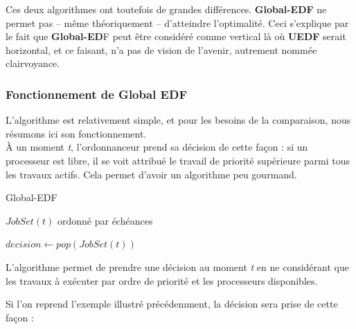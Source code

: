 	Ces deux algorithmes ont toutefois de grandes différences. \textbf{Global-EDF}
	ne permet pas -- même théoriquement -- d'atteindre l'optimalité. Ceci s'explique par le fait que 
	\textbf{Global-ED}F peut être considéré comme \og{}vertical\fg{} là où \textbf{UEDF} serait \og{}horizontal\fg{}, et ce faisant, 
	n'a pas de \og{}vision de l'avenir\fg{}, autrement nommée \og{}clairvoyance\fg{}.
	
	\subsubsection{Fonctionnement de Global EDF}
	
	L'algorithme est relativement simple, et pour les besoins de la comparaison, nous résumons 
	ici son fonctionnement.\\
	À un moment \textit{t}, l'ordonnanceur prend sa décision de cette façon :
	si un processeur est libre, il se voit attribué le travail de priorité supérieure parmi 
	tous les travaux actifs. Cela permet d'avoir un algorithme peu gourmand.
	
	\begin{algorithm}
	\caption{Global-EDF}
	\begin{algorithmic}
		\REQUIRE $JobSet(t)$ ordonné par échéances
			\item $decision \leftarrow pop(JobSet(t))$
		\ENDFOR
	\end{algorithmic}
\end{algorithm}	
	
	L'algorithme permet de prendre une décision au moment \textit{t} en ne considérant 
	que les travaux à exécuter par ordre de priorité et les processeurs disponibles.
	
	Si l'on reprend l'exemple illustré précédemment, la décision sera prise de cette façon :\newline
	
